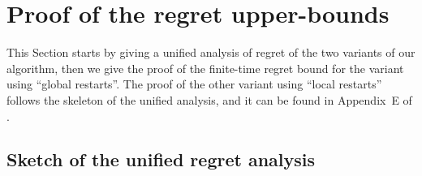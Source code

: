 

\section{Proof of the regret upper-bounds}
\label{sec:6:proofRegret}

This Section starts by giving a unified analysis of regret of the two variants of our algorithm, then we give the proof of the finite-time regret bound for the variant using ``global restarts''.
The proof of the other variant using ``local restarts'' follows the skeleton of the unified analysis, and it can be found in Appendix~E of \cite{Besson2019GLRT}.

\subsection{Sketch of the unified regret analysis}
\label{sub:6:proofSkeleton}

